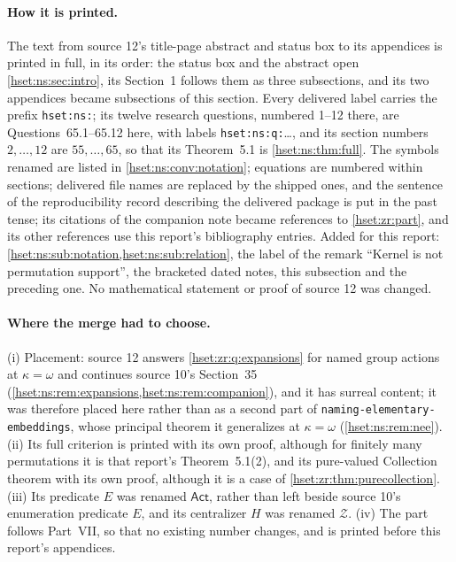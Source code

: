\documentclass[11pt,letterpaper]{article}
\theoremstyle{definition}
\theoremstyle{remark}
\newcommand{\repo}[1]{\nolinkurl{#1}}
\newcommand{\Act}{\mathsf{Act}}
\begin{document}
\paragraph{How it is printed.} The text from source 12's title-page abstract
and status box to its appendices is printed in full, in its order: the status
box and the abstract open \cref{hset:ns:sec:intro}, its Section~1 follows them
as three subsections, and its two appendices became subsections of this
section. Every delivered label carries the prefix \texttt{hset:ns:}; its twelve
research questions, numbered 1--12 there, are Questions~65.1--65.12 here, with
labels \texttt{hset:ns:q:}\dots, and its section numbers $2,\dots,12$ are
$55,\dots,65$, so that its Theorem~5.1 is \cref{hset:ns:thm:full}. The symbols
renamed are listed in \cref{hset:ns:conv:notation}; equations are numbered
within sections; delivered file names are replaced by the shipped ones, and the
sentence of the reproducibility record describing the delivered package is put
in the past tense; its citations of the companion note became references to
\cref{hset:zr:part}, and its other references use this report's bibliography
entries. Added for this report: \cref{hset:ns:sub:notation,hset:ns:sub:relation},
the label of the remark ``Kernel is not permutation support'', the bracketed
dated notes, this subsection and the preceding one. No mathematical statement or
proof of source 12 was changed.

\paragraph{Where the merge had to choose.} (i) Placement: source 12 answers
\cref{hset:zr:q:expansions} for named group actions at $\kappa=\omega$ and
continues source 10's Section~35 (\cref{hset:ns:rem:expansions,hset:ns:rem:companion}),
and it has surreal content; it was therefore placed here rather than as a second
part of \repo{naming-elementary-embeddings}, whose principal theorem it
generalizes at $\kappa=\omega$ (\cref{hset:ns:rem:nee}). (ii) Its full criterion
is printed with its own proof, although for finitely many permutations it is
that report's Theorem~5.1(2), and its pure-valued Collection theorem with its
own proof, although it is a case of \cref{hset:zr:thm:purecollection}. (iii) Its
predicate $E$ was renamed $\Act$, rather than left beside source 10's
enumeration predicate $E$, and its centralizer $H$ was renamed $\mathcal Z$.
(iv) The part follows Part~VII, so that no existing number changes, and is
printed before this report's appendices.
\end{document}
